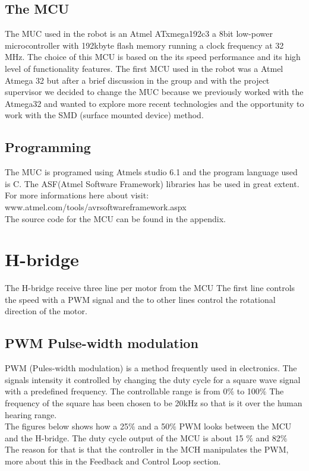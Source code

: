 \subsection{The MCU}
The MUC used in the robot is an Atmel ATxmega192c3 a 8bit low-power microcontroller with 192kbyte flash memory running a clock frequency at 32 MHz. The choice of this MCU is based on the its speed performance and its high level of functionality features. The first MCU used in the robot was a Atmel Atmega 32 but after a brief discussion in the group and with the project supervisor we decided to change the MUC because we previously worked with the Atmega32 and wanted to explore more recent technologies and the opportunity to work with the SMD (surface mounted device) method. 

\subsection{Programming}
The MUC is programed using Atmels studio 6.1 and the program language used is C. The ASF(Atmel Software Framework) libraries has be used in great extent. For more informations here about visit:\\  www.atmel.com/tools/avrsoftwareframework.aspx \\
The source code for the MCU can be found in the appendix. 

\section{H-bridge}

The H-bridge receive three line per motor from the MCU The first line controls the speed with a PWM signal and the to other lines control the rotational direction of the motor.


\newpage

\subsection{PWM Pulse-width modulation}

PWM (Pules-width modulation) is a method frequently used in electronics. The signals intensity it controlled by changing the duty cycle for a square wave signal with a predefined frequency. The controllable range is from 0$\% $ to 100$\%$ 
The frequency of the square has been chosen to be 20kHz so that is it over the human hearing range. 
\\
The figures below shows how a 25$\%$ and a 50$\%$  PWM looks between the MCU and the H-bridge. The duty cycle output of the MCU is about 15 $\%$ and 82$\%$ The reason for that is that the controller in the MCH manipulates the PWM, more about this in the Feedback and Control Loop section.

